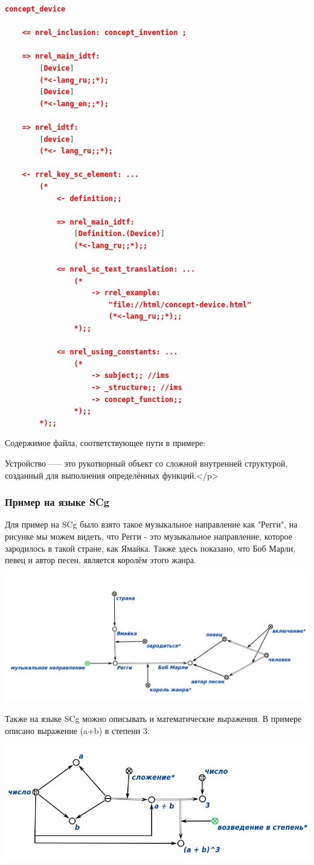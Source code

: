  \begin{lstlisting}[language=json,firstnumber=1]
concept_device

    <= nrel_inclusion: concept_invention ;

    => nrel_main_idtf:
        [Device]
        (*<-lang_ru;;*);
        [Device]
        (*<-lang_en;;*);

    => nrel_idtf:
        [device]
        (*<- lang_ru;;*);

    <- rrel_key_sc_element: ...
        (*
            <- definition;;

            => nrel_main_idtf:
                [Definition.(Device)]
                (*<-lang_ru;;*);;

            <= nrel_sc_text_translation: ...
                (* 
                    -> rrel_example: 
                        "file://html/concept-device.html"
                        (*<-lang_ru;;*);; 
                *);;

            <= nrel_using_constants: ...
                (*
                    -> subject;; //ims
                    -> _structure;; //ims
                    -> concept_function;;
                *);;
        *);;
\end{lstlisting}
Содержимое файла, соответствующее пути в примере:

Устройство --— это рукотворный объект со сложной внутренней структурой, 
созданный для выполнения определённых функций.</p>

\subsubsection{Пример на языке SCg}

Для пример на SCg было взято такое музыкальное направление как "Регги", на рисунке мы можем видеть, что Регги - это музыкальное направление, которое зародилось в такой стране, как Ямайка. Также здесь показано, что Боб Марли, певец и автор песен, является королём этого жанра.

\includegraphics[scale=0.4]{images/sc10.png}

 Также на языке SCg можно описывать и математические выражения.
 В примере описано выражение (a+b) в степени 3:
 
\includegraphics[scale=0.5]{images/sc11.png}


